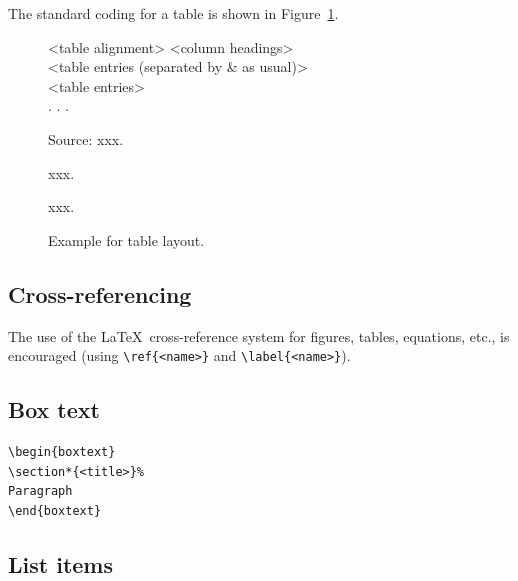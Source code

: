 \documentclass[ACS,STIX1COL]{WileyNJD-v2}
\begin{document}
The standard coding for a table is shown in Figure~\ref{F2}.

\begin{figure}[h]
\setlength{\fboxsep}{0pt}%
\setlength{\fboxrule}{0pt}%
\begin{center}
\begin{boxedverbatim}
\begin{table}
\caption{<Table caption>}
\centering
\begin{tabular}{<table alignment>}
\toprule
<column headings>\\
\midrule
<table entries
(separated by & as usual)>\\
<table entries>\\
.
.
.\\
\bottomrule
\end{tabular}
\begin{tablenotes}
\item Source: xxx.
\item[1] xxx.
\item[2] xxx.
\end{tablenotes}
\end{table}
\end{boxedverbatim}
\end{center}
\caption{Example for table layout.\label{F2}}
\end{figure}

\subsection{Cross-referencing}
The use of the \LaTeX\ cross-reference system
for figures, tables, equations, etc., is encouraged
(using \verb"\ref{<name>}" and \verb"\label{<name>}").

\subsection{Box text}

\begin{verbatim}
\begin{boxtext}
\section*{<title>}%
Paragraph
\end{boxtext}
\end{verbatim}

\subsection{List items}
\end{document}
